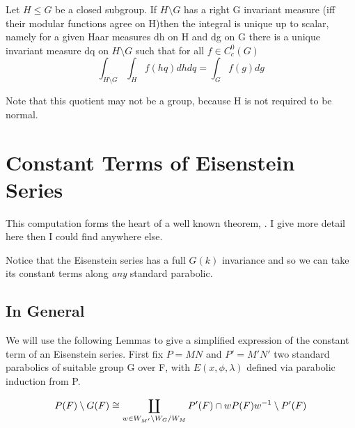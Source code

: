\begin{Theorem}
        Let \(H\leq G\) be a closed subgroup. If \(H\setminus G\) has a right G invariant measure (iff their modular functions agree on H)then the integral is unique up to scalar, namely for a given Haar measures dh on H and dg on G there is a unique invariant measure dq on \(H\setminus G\) such that for all \(f\in C_c^0(G)\)
        \[\int_{H\setminus G}\int_H f(hq)dhdq = \int_G f(g) dg\]
    \end{Theorem}
    Note that this quotient may not be a group, because H is not required to be normal.

\section{Constant Terms of Eisenstein Series}\label{const_eisenstein}
This computation forms the heart of a well known theorem, \cite[Prop 10.4.2]{getzIntroductionAutomorphicRepresentations2024}\cite[II.1.7]{moeglinSpectralDecompositionEisenstein1995}\cite[6.2]{shahidiEisensteinSeriesAutomorphic2010}. I give more detail here then I could find anywhere else. 

Notice that the Eisenstein series has a full \(G(k)\) invariance and so we can take its constant terms along \textit{any} standard parabolic.

\subsection{In General}
We will use the following Lemmas to give a simplified expression of the constant term of an Eisenstein series. First fix \(P = MN\) and \(P' = M'N'\) two standard parabolics of suitable group G over F, with \(E(x, \phi, \lambda)\) defined via  parabolic induction from P.

    \begin{Lemma}\label{lem:1}
        \[P(F)\setminus G(F) \cong \coprod_{w\in W_{M'}\setminus W_G / W_{M}} P'(F)\cap wP(F)w^{-1} \setminus P'(F)\]
    \end{Lemma}

